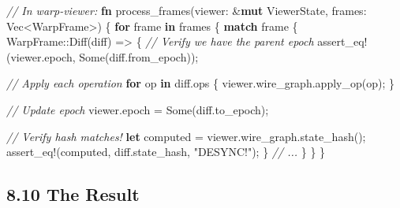 \documentclass[
]{book}
\newenvironment{Shaded}{}{}
\newcommand{\CommentTok}[1]{\textcolor[rgb]{0.38,0.63,0.69}{\textit{#1}}}
\newcommand{\ConstantTok}[1]{\textcolor[rgb]{0.53,0.00,0.00}{#1}}
\newcommand{\ControlFlowTok}[1]{\textcolor[rgb]{0.00,0.44,0.13}{\textbf{#1}}}
\newcommand{\DataTypeTok}[1]{\textcolor[rgb]{0.56,0.13,0.00}{#1}}
\newcommand{\KeywordTok}[1]{\textcolor[rgb]{0.00,0.44,0.13}{\textbf{#1}}}
\newcommand{\NormalTok}[1]{#1}
\newcommand{\OperatorTok}[1]{\textcolor[rgb]{0.40,0.40,0.40}{#1}}
\newcommand{\PreprocessorTok}[1]{\textcolor[rgb]{0.74,0.48,0.00}{#1}}
\newcommand{\StringTok}[1]{\textcolor[rgb]{0.25,0.44,0.63}{#1}}
\begin{document}
\begin{Shaded}
\begin{Highlighting}[]
\CommentTok{// In warp{-}viewer:}
\KeywordTok{fn}\NormalTok{ process\_frames(viewer}\OperatorTok{:} \OperatorTok{\&}\KeywordTok{mut}\NormalTok{ ViewerState}\OperatorTok{,}\NormalTok{ frames}\OperatorTok{:} \DataTypeTok{Vec}\OperatorTok{\textless{}}\NormalTok{WarpFrame}\OperatorTok{\textgreater{}}\NormalTok{) }\OperatorTok{\{}
    \ControlFlowTok{for}\NormalTok{ frame }\KeywordTok{in}\NormalTok{ frames }\OperatorTok{\{}
        \ControlFlowTok{match}\NormalTok{ frame }\OperatorTok{\{}
            \PreprocessorTok{WarpFrame::}\NormalTok{Diff(diff) }\OperatorTok{=\textgreater{}} \OperatorTok{\{}
                \CommentTok{// Verify we have the parent epoch}
                \PreprocessorTok{assert\_eq!}\NormalTok{(viewer}\OperatorTok{.}\NormalTok{epoch}\OperatorTok{,} \ConstantTok{Some}\NormalTok{(diff}\OperatorTok{.}\NormalTok{from\_epoch))}\OperatorTok{;}

                \CommentTok{// Apply each operation}
                \ControlFlowTok{for}\NormalTok{ op }\KeywordTok{in}\NormalTok{ diff}\OperatorTok{.}\NormalTok{ops }\OperatorTok{\{}
\NormalTok{                    viewer}\OperatorTok{.}\NormalTok{wire\_graph}\OperatorTok{.}\NormalTok{apply\_op(op)}\OperatorTok{;}
                \OperatorTok{\}}

                \CommentTok{// Update epoch}
\NormalTok{                viewer}\OperatorTok{.}\NormalTok{epoch }\OperatorTok{=} \ConstantTok{Some}\NormalTok{(diff}\OperatorTok{.}\NormalTok{to\_epoch)}\OperatorTok{;}

                \CommentTok{// Verify hash matches!}
                \KeywordTok{let}\NormalTok{ computed }\OperatorTok{=}\NormalTok{ viewer}\OperatorTok{.}\NormalTok{wire\_graph}\OperatorTok{.}\NormalTok{state\_hash()}\OperatorTok{;}
                \PreprocessorTok{assert\_eq!}\NormalTok{(computed}\OperatorTok{,}\NormalTok{ diff}\OperatorTok{.}\NormalTok{state\_hash}\OperatorTok{,} \StringTok{"DESYNC!"}\NormalTok{)}\OperatorTok{;}
            \OperatorTok{\}}
            \CommentTok{// ...}
        \OperatorTok{\}}
    \OperatorTok{\}}
\OperatorTok{\}}
\end{Highlighting}
\end{Shaded}

\subsection{8.10 The Result}\label{the-result}
\end{document}
